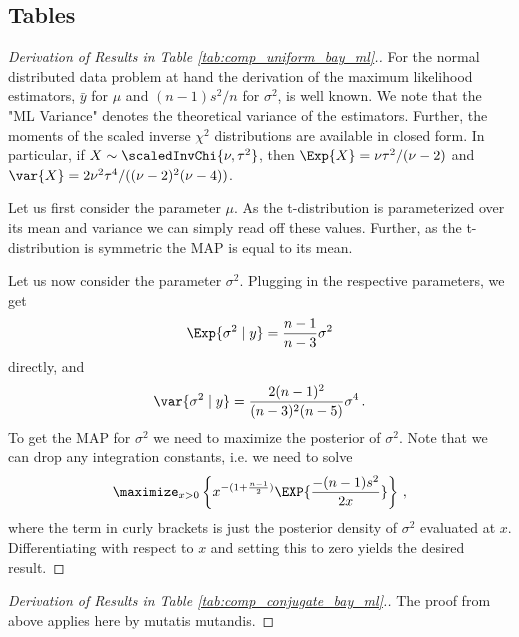 \subsection{Tables}

\begin{proof}[Derivation of Results in Table \ref{tab:comp_uniform_bay_ml}.]
  For the normal distributed data problem at hand the derivation of the maximum likelihood estimators, $\bar{y}$ for $\mu$ and $(n-1) s^2 / n$ for $\sigma^2$, is well known.
  We note that the "ML Variance" denotes the theoretical variance of the estimators.
  Further, the moments of the scaled inverse $\chi^2$ distributions are available in closed form.
  In particular, if $X \sim \scaledInvChi{\nu, \tau^2}$, then $\Exp{X} = \nu \tau^2 / (\nu - 2)$ and $\var{X} = 2 \nu^2 \tau^4 / ((\nu - 2)^2 (\nu - 4))$.

  Let us first consider the parameter $\mu$.
  As the t-distribution is parameterized over its mean and variance we can simply read off these values.
  Further, as the t-distribution is symmetric the MAP is equal to its mean.

  Let us now consider the parameter $\sigma^2$.
  Plugging in the respective parameters, we get
  \begin{align*}
    \Exp{\sigma^2 \mid y} = \frac{n - 1}{n - 3} \sigma^2
  \end{align*}
  directly, and
  \begin{align*}
    \var{\sigma^2 \mid y} = \frac{2 (n-1)^2}{(n-3)^2(n-5)} \sigma^4 \,.
  \end{align*}
  To get the MAP for $\sigma^2$ we need to maximize the posterior of $\sigma^2$.
  Note that we can drop any integration constants, i.e. we need to solve
  \begin{align*}
    \maximize_{x > 0} \left\{x^{-(1 + \frac{n-1}{2})} \EXP{\frac{-(n-1) s^2}{2 x}}\right\} \,,
  \end{align*}
  where the term in curly brackets is just the posterior density of $\sigma^2$ evaluated at $x$.
  Differentiating with respect to $x$ and setting this to zero yields the desired result.
\end{proof}

\begin{proof}[Derivation of Results in Table \ref{tab:comp_conjugate_bay_ml}.]
  The proof from above applies here by mutatis mutandis.
\end{proof}


